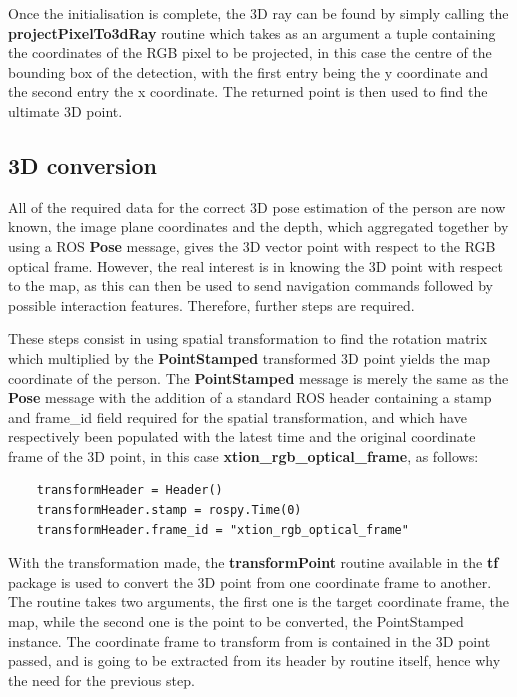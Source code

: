 Once the initialisation is complete, the 3D ray can be found by simply calling the \textbf{projectPixelTo3dRay} routine which takes as an argument a tuple containing the coordinates of the RGB pixel to be projected, in this case the centre of the bounding box of the detection, with the first entry being the y coordinate and the second entry the x coordinate. The returned point is then used to find the ultimate 3D point.

\subsection{3D conversion}

All of the required data for the correct 3D pose estimation of the person are now known, the image plane coordinates and the depth, which aggregated together by using a ROS \textbf{Pose} message, gives the 3D vector point with respect to the RGB optical frame. However, the real interest is in knowing the 3D point with respect to the map, as this can then be used to send navigation commands followed by possible interaction features. Therefore, further steps are required.

These steps consist in using spatial transformation to find the rotation matrix which multiplied by the \textbf{PointStamped} transformed 3D point yields the map coordinate of the person. The \textbf{PointStamped} message is merely the same as the \textbf{Pose} message with the addition of a standard ROS header containing a stamp and frame\_id field required for the spatial transformation, and which have respectively been populated with the latest time and the original coordinate frame of the 3D point, in this case \textbf{xtion\_rgb\_optical\_frame}, as follows:

\begin{lstlisting}
	transformHeader = Header()
	transformHeader.stamp = rospy.Time(0)
	transformHeader.frame_id = "xtion_rgb_optical_frame"
\end{lstlisting}

With the transformation made, the \textbf{transformPoint} routine available in the \textbf{tf} package is used to convert the 3D point from one coordinate frame to another. The routine takes two arguments, the first one is the target coordinate frame, the map, while the second one is the point to be converted, the PointStamped instance. The coordinate frame to transform from is contained in the 3D point passed, and is going to be extracted from its header by routine itself, hence why the need for the previous step.

